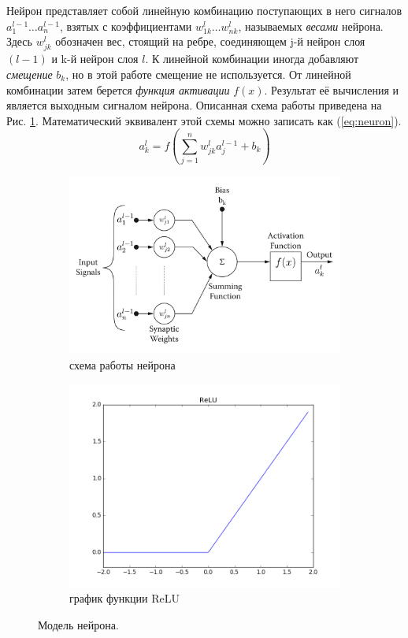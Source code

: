 \documentclass[a4paper,12pt]{article}
\theoremstyle{remark}
\begin{document}
	Нейрон представляет собой линейную комбинацию поступающих в него сигналов $a_1^{l-1} \dots a_n^{l-1}$, взятых с коэффициентами $w_{1k}^l \dots w_{nk}^l$, называемых \textit{весами} нейрона. Здесь $w_{jk}^l$ обозначен вес, стоящий на ребре, соединяющем j-й нейрон слоя $(l-1)$ и k-й нейрон слоя $l$. К линейной комбинации иногда добавляют \textit{смещение} $b_k$, но в этой работе смещение не используется. От линейной комбинации затем берется \textit{функция активации} $f(x)$. Результат её вычисления и является выходным сигналом нейрона. Описанная схема работы приведена на Рис. \ref{fig:neuron_a}. Математический эквивалент этой схемы можно записать как (\ref{eq:neuron}).
	\begin{equation}\label{eq:neuron}
		a_k^l = f(\sum_{j=1}^{n} w_{jk}^l a_j^{l-1} + b_k)
	\end{equation}
	
	\begin{figure}[h]
		\begin{subfigure}[t]{0.6\textwidth}
			\includegraphics[width=\linewidth]{neuron.png}
			\caption{схема работы нейрона}
			\label{fig:neuron_a}
		\end{subfigure}
		\begin{subfigure}[t]{0.4\textwidth}
			\includegraphics[width=\linewidth]{relu.png}
			\caption{график функции ReLU}
			\label{fig:neuron_b}
		\end{subfigure}
		\caption{Модель нейрона.}
		\label{fig:neuron}
	\end{figure}
	
\end{document}
